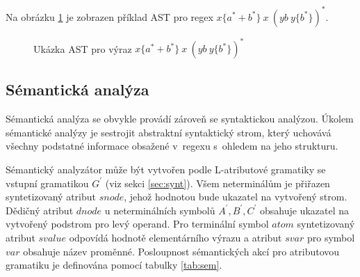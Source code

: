 \documentclass[thesis=B,czech]{FITthesis}[2019/12/23]
\theoremstyle{definition}
\begin{document}
Na obrázku \ref{fig:ast} je zobrazen příklad AST pro regex $x\{a^\ast+b^\ast\} \ x \ (yb \ y \{b^\ast\})^\ast$.

\begin{figure}[h]
\centering

\caption{Ukázka AST pro výraz  $x\{a^\ast+b^\ast\} \ x \ (yb \ y \{b^\ast\})^\ast$}\label{fig:ast}
\end{figure}

\subsection{Sémantická analýza}\label{sec:semantic}
Sémantická analýza se obvykle provádí zároveň se syntaktickou analýzou. Úkolem sémantické analýzy je sestrojit abstraktní syntaktický strom, který uchovává všechny podstatné informace obsažené v~regexu s~ohledem na jeho strukturu. 

Sémantický analyzátor může být vytvořen podle L-atributové gramatiky se vstupní gramatikou $G^\prime$ (viz sekci \ref{sec:synt}). Všem neterminálům je přiřazen syntetizovaný atribut $snode$, jehož hodnotou bude ukazatel na vytvořený strom. Dědičný atribut $dnode$ u neterminálních symbolů $A^\prime, B^\prime, C^\prime$ obsahuje ukazatel na vytvořený podstrom pro levý operand. Pro terminální symbol $atom$ syntetizovaný atribut $svalue$ odpovídá hodnotě elementárního výrazu a atribut $svar$ pro symbol $var$ obsahuje název proměnné.
Posloupnost sémantických akcí pro atributovou gramatiku je definována pomocí tabulky \ref{tab:sem}.
\end{document}
